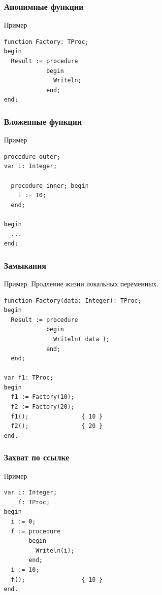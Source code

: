 \documentclass[roman,12pt]{beamer}
\begin{document}
\begin{frame}[fragile]
  \frametitle{Анонимные функции}
  \begin{block}{Пример}
\begin{lstlisting}
function Factory: TProc;
begin
  Result := procedure
            begin
              Writeln;
            end;
end;
\end{lstlisting}

  \end{block} 
\end{frame}

\begin{frame}[fragile]
  \frametitle{Вложенные функции}
  
  \begin{block}{Пример}
\begin{lstlisting}    
procedure outer;
var i: Integer;

  procedure inner; begin
    i := 10;
  end;

begin
  ...
end;    
\end{lstlisting}
  \end{block} 

\end{frame}

\begin{frame}[fragile]
  \frametitle{Замыкания}
  \begin{block}{Пример. Продление жизни локальных переменных.}
\begin{lstlisting}
function Factory(data: Integer): TProc;
begin
  Result := procedure
            begin
              Writeln( data );
            end;
  end;
    
var f1: TProc;
begin
  f1 := Factory(10);
  f2 := Factory(20);
  f1();               { 10 }
  f2();               { 20 }
end.
\end{lstlisting}    
  \end{block} 
\end{frame}

\begin{frame}[fragile]
  \frametitle{Захват по ссылке}
  \begin{block}{Пример}
\begin{lstlisting}
var i: Integer;
    f: TProc;
begin
  i := 0;
  f := procedure
       begin
         Writeln(i);
       end;
  i := 10;
  f();                { 10 }
end.
\end{lstlisting}
 \end{block} 
\end{frame}
\end{document}
